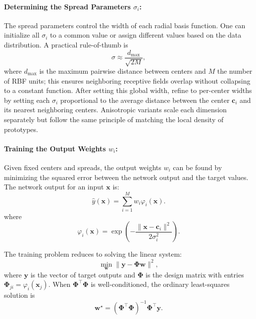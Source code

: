 \paragraph{Determining the Spread Parameters \(\sigma_i\):}
The spread parameters control the width of each radial basis function. One can initialize all \( \sigma_i \) to a common value or assign different values based on the data distribution. A practical rule-of-thumb is
\[
\sigma \approx \frac{d_{\max}}{\sqrt{2M}},
\]
where \(d_{\max}\) is the maximum pairwise distance between centers and \(M\) the number of RBF units; this ensures neighboring receptive fields overlap without collapsing to a constant function. After setting this global width, refine to per-center widths by setting each \( \sigma_i \) proportional to the average distance between the center \( \mathbf{c}_i \) and its nearest neighboring centers. Anisotropic variants scale each dimension separately but follow the same principle of matching the local density of prototypes.

\paragraph{Training the Output Weights \( w_i \):}
Given fixed centers and spreads, the output weights \( w_i \) can be found by minimizing the squared error between the network output and the target values. The network output for an input \( \mathbf{x} \) is:
\[
\hat{y}(\mathbf{x}) = \sum_{i=1}^M w_i \varphi_i(\mathbf{x}).
\]
where
\[
\varphi_i(\mathbf{x}) = \exp\left(-\frac{\|\mathbf{x} - \mathbf{c}_i\|^2}{2\sigma_i^2}\right).
\]

    The training problem reduces to solving the linear system:
\begin{equation}
\min_{\mathbf{w}} \| \mathbf{y} - \boldsymbol{\Phi} \mathbf{w} \|^2,
\label{eq:rbf_weight_training}
\end{equation}
where \(\mathbf{y}\) is the vector of target outputs and \(\boldsymbol{\Phi}\) is the design matrix with entries \(\boldsymbol{\Phi}_{ji} = \varphi_i(\mathbf{x}_j)\).
When \(\boldsymbol{\Phi}^\top\boldsymbol{\Phi}\) is well-conditioned, the ordinary least-squares solution is
\[
    \mathbf{w}^\star = (\boldsymbol{\Phi}^\top \boldsymbol{\Phi})^{-1}\boldsymbol{\Phi}^\top \mathbf{y}.
\]

